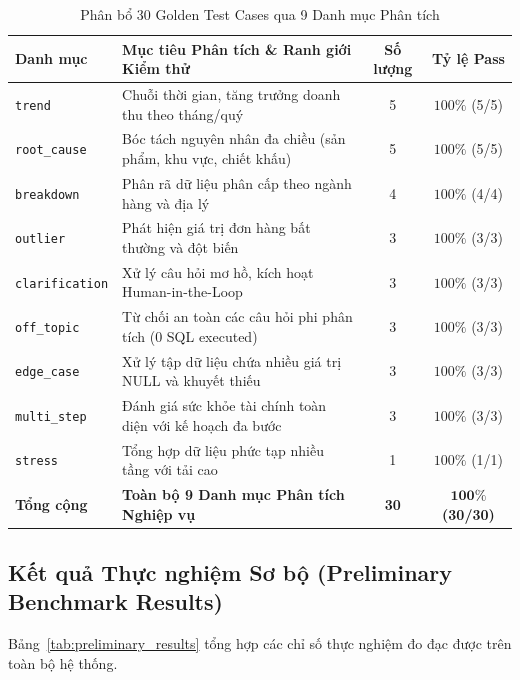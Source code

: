\documentclass[12pt, a4paper]{article}
\begin{document}
\begin{table}[H]
\centering
\caption{Phân bổ 30 Golden Test Cases qua 9 Danh mục Phân tích}
\label{tab:golden_categories}
\begin{tabularx}{\textwidth}{lXcc}
\toprule
\textbf{Danh mục} & \textbf{Mục tiêu Phân tích \& Ranh giới Kiểm thử} & \textbf{Số lượng} & \textbf{Tỷ lệ Pass} \\
\midrule
\texttt{trend} & Chuỗi thời gian, tăng trưởng doanh thu theo tháng/quý & 5 & $100\%$ (5/5) \\
\texttt{root\_cause} & Bóc tách nguyên nhân đa chiều (sản phẩm, khu vực, chiết khấu) & 5 & $100\%$ (5/5) \\
\texttt{breakdown} & Phân rã dữ liệu phân cấp theo ngành hàng và địa lý & 4 & $100\%$ (4/4) \\
\texttt{outlier} & Phát hiện giá trị đơn hàng bất thường và đột biến & 3 & $100\%$ (3/3) \\
\texttt{clarification} & Xử lý câu hỏi mơ hồ, kích hoạt Human-in-the-Loop & 3 & $100\%$ (3/3) \\
\texttt{off\_topic} & Từ chối an toàn các câu hỏi phi phân tích (0 SQL executed) & 3 & $100\%$ (3/3) \\
\texttt{edge\_case} & Xử lý tập dữ liệu chứa nhiều giá trị NULL và khuyết thiếu & 3 & $100\%$ (3/3) \\
\texttt{multi\_step} & Đánh giá sức khỏe tài chính toàn diện với kế hoạch đa bước & 3 & $100\%$ (3/3) \\
\texttt{stress} & Tổng hợp dữ liệu phức tạp nhiều tầng với tải cao & 1 & $100\%$ (1/1) \\
\midrule
\textbf{Tổng cộng} & \textbf{Toàn bộ 9 Danh mục Phân tích Nghiệp vụ} & \textbf{30} & $\mathbf{100\%}$ \textbf{(30/30)} \\
\bottomrule
\end{tabularx}
\end{table}

\subsection{Kết quả Thực nghiệm Sơ bộ (Preliminary Benchmark Results)}
Bảng~\ref{tab:preliminary_results} tổng hợp các chỉ số thực nghiệm đo đạc được trên toàn bộ hệ thống.
\end{document}
